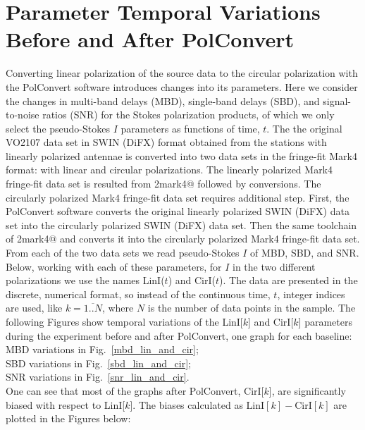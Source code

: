 \documentclass[letterpaper,twoside,12pt]{article}
\begin{document}
\section{Parameter Temporal Variations Before and After PolConvert}

Converting linear polarization of the source data to the circular polarization with the PolConvert software introduces changes into its parameters. Here we consider the changes in multi-band delays (MBD), single-band delays (SBD), and signal-to-noise ratios (SNR) for the Stokes polarization products, of which we only select the pseudo-Stokes $I$ parameters as functions of time, $t$. The the original VO2107 data set in SWIN (DiFX) format obtained from the stations with linearly polarized antennae is converted into two data sets in the fringe-fit Mark4 format: with linear and circular polarizations. The linearly polarized Mark4 fringe-fit data set is resulted from \verb@difx2mark4@ followed by \verb@fourfit@ conversions. The circularly polarized Mark4 fringe-fit data set requires additional step. First, the PolConvert software converts the original linearly polarized SWIN (DiFX) data set into the circularly polarized SWIN (DiFX) data set. Then the same toolchain of \verb@difx2mark4@ and \verb@fourfit@ converts it into the circularly polarized Mark4 fringe-fit data set. From each of the two data sets we read pseudo-Stokes $I$ of MBD, SBD, and SNR. Below, working with each of these parameters, for $I$ in the two different polarizations we use the names LinI($t$) and CirI($t$). The data are presented in the discrete, numerical format, so instead of the continuous time, $t$, integer indices are used, like $k=\overline{1..N}$, where $N$ is the number of data points in the sample. The following Figures show temporal variations of the LinI[$k$] and CirI[$k$] parameters during the experiment before and after PolConvert, one graph for each baseline:  \\


\indent MBD variations in Fig.~\ref{mbd_lin_and_cir};  \\
\indent SBD variations in Fig.~\ref{sbd_lin_and_cir};  \\
\indent SNR variations in Fig.~\ref{snr_lin_and_cir}.  \\


One can see that most of the graphs after PolConvert, CirI[$k$], are significantly biased with respect to LinI[$k$]. The biases calculated as $\mathrm{LinI}[k] - \mathrm{CirI}[k]$ are plotted in the Figures below: \\
\end{document}
